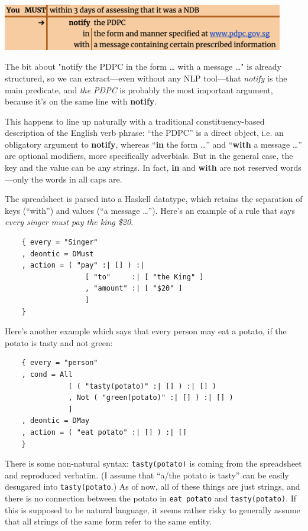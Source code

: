 \documentclass[runningheads]{llncs}
\begin{document}
\noindent \includegraphics[width=123mm]{images/spreadsheets-complex.png}

\noindent The bit about "notify the PDPC in the form … with a message …" is already structured, so we can extract---even without any NLP tool---that \textit{notify} is the main predicate, and \textit{the PDPC} is probably the most important argument, because it's on the same line with \textbf{notify}. 

This happens to line up naturally with a traditional constituency-based description of the English verb phrase: ``the PDPC'' is a direct object, i.e. an obligatory argument to \textbf{notify}, whereas ``\textbf{in} the form \dots'' and ``\textbf{with} a message \dots'' are optional modifiers, more specifically adverbials. But in the general case, the key and the value  can be any strings. In fact, \textbf{in} and \textbf{with} are not reserved words---only the words in all caps are.

The spreadsheet is parsed into a Haskell datatype, which retains the separation of keys (``with'') and values (``a message \dots''). Here's an example of a rule that says \textit{every singer must pay the king \$20}.

\begin{verbatim}
    { every = "Singer"
    , deontic = DMust
    , action = ( "pay" :| [] ) :|
                   [ "to"     :| [ "the King" ]
                   , "amount" :| [ "$20" ]
                   ]
    }
\end{verbatim}

Here's another example which says that every person may eat a potato, if the potato is tasty and not green: 

\begin{verbatim}
    { every = "person"
    , cond = All
               [ ( "tasty(potato)" :| [] ) :| [] )
               , Not ( "green(potato)" :| [] ) :| [] )
               ]
    , deontic = DMay
    , action = ( "eat potato" :| [] ) :| []
    }
\end{verbatim}

There is some non-natural syntax: \texttt{tasty(potato)} is coming from the spreadsheet and reproduced verbatim. (I assume that ``a/the potato is tasty'' can be easily desugared into \texttt{tasty(potato}.) As of now, all of these things are just strings, and there is no connection between the potato in \texttt{eat potato} and \texttt{tasty(potato)}. If this is supposed to be natural language, it seems rather risky to generally assume that all strings of the same form refer to the same entity.
\end{document}
